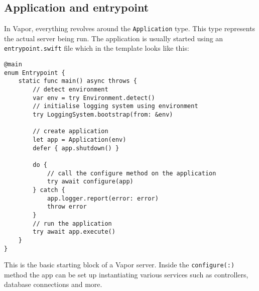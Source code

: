 \subsection{Application and entrypoint}
In Vapor, everything revolves around the \lstinline{Application} type. This type represents the actual server being run. The application is usually started using an \lstinline{entrypoint.swift} file which in the template looks like this:
\begin{verbatim}
@main
enum Entrypoint {
    static func main() async throws {
        // detect environment
        var env = try Environment.detect()
        // initialise logging system using environment
        try LoggingSystem.bootstrap(from: &env)

        // create application
        let app = Application(env)
        defer { app.shutdown() }
        
        do {
            // call the configure method on the application
            try await configure(app)
        } catch {
            app.logger.report(error: error)
            throw error
        }
        // run the application
        try await app.execute()
    }
}
\end{verbatim}
This is the basic starting block of a Vapor server. Inside the \lstinline{configure(:)} method the app can be set up instantiating various services such as controllers, database connections and more.\cite{vapor-docs}

